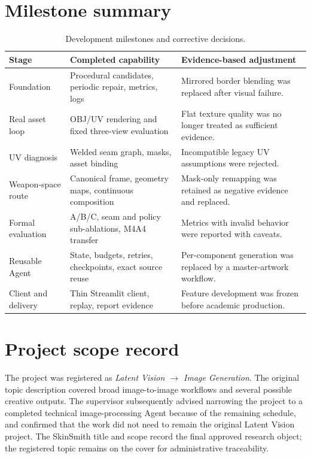 \section{Milestone summary}

\begin{table}[H]
  \centering
  \caption{Development milestones and corrective decisions.}
  \small
  \begin{tabularx}{\textwidth}{p{25mm} p{38mm} X}
    \toprule
    Stage & Completed capability & Evidence-based adjustment\\
    \midrule
    Foundation & Procedural candidates, periodic repair, metrics, logs &
    Mirrored border blending was replaced after visual failure.\\
    Real asset loop & OBJ/UV rendering and fixed three-view evaluation &
    Flat texture quality was no longer treated as sufficient evidence.\\
    UV diagnosis & Welded seam graph, masks, asset binding &
    Incompatible legacy UV assumptions were rejected.\\
    Weapon-space route & Canonical frame, geometry maps, continuous composition &
    Mask-only remapping was retained as negative evidence and replaced.\\
    Formal evaluation & A/B/C, seam and policy sub-ablations, M4A4 transfer &
    Metrics with invalid behavior were reported with caveats.\\
    Reusable Agent & State, budgets, retries, checkpoints, exact source reuse &
    Per-component generation was replaced by a master-artwork workflow.\\
    Client and delivery & Thin Streamlit client, replay, report evidence &
    Feature development was frozen before academic production.\\
    \bottomrule
  \end{tabularx}
\end{table}

\section{Project scope record}

The project was registered as \emph{Latent Vision $\rightarrow$ Image Generation}.
The original topic description covered broad image-to-image workflows and several
possible creative outputs. The supervisor subsequently advised narrowing the
project to a completed technical image-processing Agent because of the remaining
schedule, and confirmed that the work did not need to remain the original Latent
Vision project. The SkinSmith title and scope record the final approved research
object; the registered topic remains on the cover for administrative traceability.

